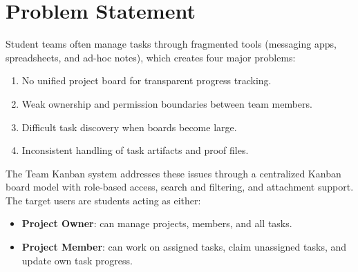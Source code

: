 \section{Problem Statement}

Student teams often manage tasks through fragmented tools (messaging apps, spreadsheets, and ad-hoc notes),
which creates four major problems:
\begin{enumerate}
    \item No unified project board for transparent progress tracking.
    \item Weak ownership and permission boundaries between team members.
    \item Difficult task discovery when boards become large.
    \item Inconsistent handling of task artifacts and proof files.
\end{enumerate}

The Team Kanban system addresses these issues through a centralized Kanban board model with role-based access,
search and filtering, and attachment support.
The target users are students acting as either:
\begin{itemize}
    \item \textbf{Project Owner}: can manage projects, members, and all tasks.
    \item \textbf{Project Member}: can work on assigned tasks, claim unassigned tasks, and update own task progress.
\end{itemize}
